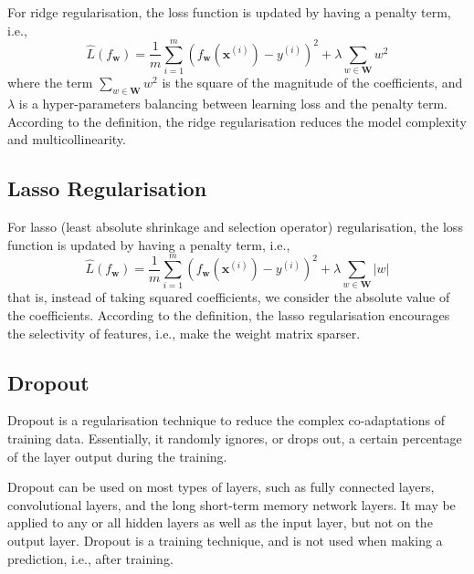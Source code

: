 For ridge regularisation, the loss function is updated by having a penalty term, i.e.,   \begin{equation}\label{equ:ridgeregularisation}
    \hat{L}(f_\textbf{w}) = \frac{1}{m}\sum_{i=1}^m(f_{\textbf{w}}(\textbf{x}^{(i)})-y^{(i)})^2 + \lambda \sum_{w\in \textbf{W}} w^2
\end{equation}
where the term $\sum_{w\in \textbf{W}} w^2$ is the square of the magnitude of the coefficients, and $\lambda$ is a hyper-parameters balancing between learning loss and the penalty term. According to the definition, the ridge regularisation reduces the model complexity and multicollinearity.  

\subsection{Lasso Regularisation}

For lasso (least absolute shrinkage and selection operator) regularisation, the loss function is updated by having a penalty term, i.e.,   \begin{equation}\label{equ:ridgeregularisation}
    \hat{L}(f_\textbf{w}) = \frac{1}{m}\sum_{i=1}^m(f_{\textbf{w}}(\textbf{x}^{(i)})-y^{(i)})^2 + \lambda \sum_{w\in \textbf{W}} |w|
\end{equation}
that is, instead of taking squared coefficients, we consider the absolute value of the coefficients. According to the definition, the lasso regularisation encourages the selectivity of features, i.e., make the weight matrix sparser. 



\subsection{Dropout}

Dropout \cite{JMLR:v15:srivastava14a} is a regularisation technique to reduce the complex co-adaptations of training data. Essentially, it randomly ignores, or drops out, a certain percentage of the layer output during the training. 


Dropout can be used on most types of layers, such as  fully connected layers, convolutional layers, and the long short-term memory network layers. It may be applied to any or all hidden layers as well as the input layer, but not on the output layer. 
%
Dropout is a training technique, and is not used when making a prediction, i.e., after training. 



